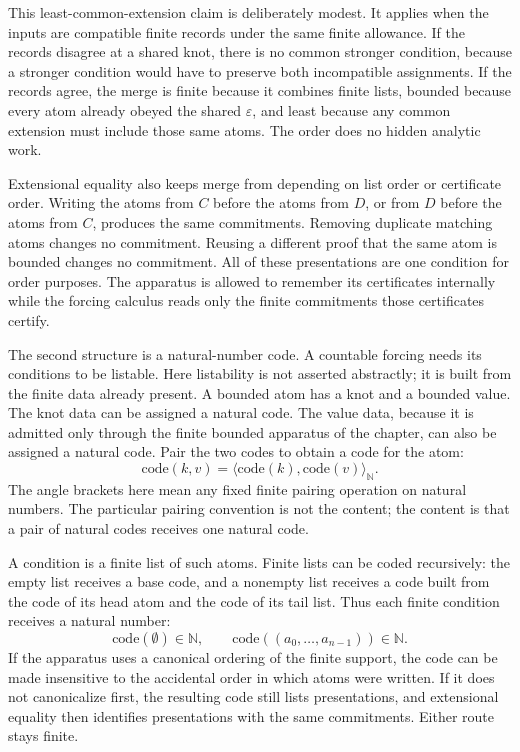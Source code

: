 This least-common-extension claim is deliberately modest. It applies when the
inputs are compatible finite records under the same finite allowance. If the
records disagree at a shared knot, there is no common stronger condition,
because a stronger condition would have to preserve both incompatible
assignments. If the records agree, the merge is finite because it combines
finite lists, bounded because every atom already obeyed the shared
\(\varepsilon\), and least because any common extension must include those
same atoms. The order does no hidden analytic work.

Extensional equality also keeps merge from depending on list order or
certificate order. Writing the atoms from \(C\) before the atoms from \(D\), or
from \(D\) before the atoms from \(C\), produces the same commitments. Removing
duplicate matching atoms changes no commitment. Reusing a different proof that
the same atom is bounded changes no commitment. All of these presentations are
one condition for order purposes. The apparatus is allowed to remember its
certificates internally while the forcing calculus reads only the finite
commitments those certificates certify.

The second structure is a natural-number code. A countable forcing needs its
conditions to be listable. Here listability is not asserted abstractly; it is
built from the finite data already present. A bounded atom has a knot and a
bounded value. The knot data can be assigned a natural code. The value data,
because it is admitted only through the finite bounded apparatus of the
chapter, can also be assigned a natural code. Pair the two codes to obtain a
code for the atom:
\[
  \mathrm{code}(k,v)
  =
  \langle \mathrm{code}(k), \mathrm{code}(v) \rangle_{\mathbb N}.
\]
The angle brackets here mean any fixed finite pairing operation on natural
numbers. The particular pairing convention is not the content; the content is
that a pair of natural codes receives one natural code.

A condition is a finite list of such atoms. Finite lists can be coded
recursively: the empty list receives a base code, and a nonempty list receives
a code built from the code of its head atom and the code of its tail list. Thus
each finite condition receives a natural number:
\[
  \mathrm{code}(\emptyset) \in \mathbb N,
  \qquad
  \mathrm{code}((a_0,\ldots,a_{n-1})) \in \mathbb N.
\]
If the apparatus uses a canonical ordering of the finite support, the code can
be made insensitive to the accidental order in which atoms were written. If it
does not canonicalize first, the resulting code still lists presentations, and
extensional equality then identifies presentations with the same commitments.
Either route stays finite.

